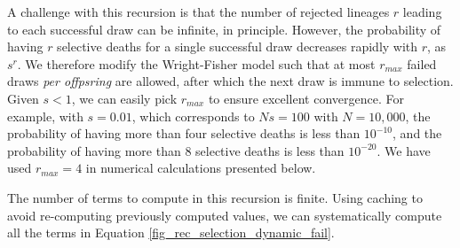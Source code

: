 \documentclass[review]{elsarticle}
\newcommand{\dslash}{/\!\!/}
\newcommand{\Coalc}[4]{\begin{bmatrix}#1\dslash #2 \\ #3\dslash #4 \end{bmatrix}}
\begin{document}
 
  
  
A challenge with this recursion is that the number of rejected lineages $r$ leading to each successful 
draw can be infinite, in principle.
 However, the probability of having $r$ selective deaths for a single successful draw decreases
rapidly with $r$, as $s^r.$ We therefore modify the Wright-Fisher model such that at most $r_{max}$ failed
draws \emph{per offpsring} are allowed, after which the next draw is immune to selection. Given
$s<1$, we can easily pick $r_{max}$ to ensure excellent convergence. For example, with $s=0.01$, 
which corresponds to $Ns=100$ with $N=10,000$, the probability of having more than 
four selective deaths is less than $10^{-10}$, and the probability of having more than 8 selective deaths is 
less than $10^{-20}.$ We have used $r_{max}=4$ in numerical calculations presented below. 

The number of terms to compute in this recursion is finite. Using caching to avoid re-computing previously computed values,
we can systematically compute all the terms in Equation \ref{fig_rec_selection_dynamic_fail}.
\end{document}
